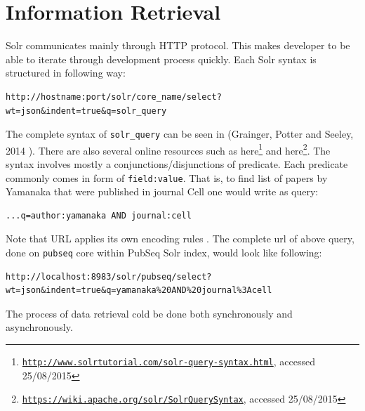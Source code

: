 \section{Information Retrieval}

Solr communicates mainly through HTTP protocol. This makes developer to be able to iterate through development process quickly. Each Solr syntax is structured in following way:

\begin{lstlisting}[breaklines]
http://hostname:port/solr/core_name/select?wt=json&indent=true&q=solr_query
\end{lstlisting}

The complete syntax of \texttt{solr\_query} can be seen in (Grainger, Potter and Seeley, 2014 \citep{grainger2014solr}). There are also several online resources such as here\footnote{\href{http://www.solrtutorial.com/solr-query-syntax.html}{\texttt{http://www.solrtutorial.com/solr-query-syntax.html}}, accessed 25/08/2015} and here\footnote{\href{https://wiki.apache.org/solr/SolrQuerySyntax}{\texttt{https://wiki.apache.org/solr/SolrQuerySyntax}}, accessed 25/08/2015}. The syntax involves mostly a conjunctions/disjunctions of predicate. Each predicate commonly comes in form of \texttt{field:value}. That is, to find list of papers by Yamanaka that were published in journal Cell one would write as query:

\begin{lstlisting}[breaklines]
...q=author:yamanaka AND journal:cell
\end{lstlisting}

Note that URL applies its own encoding rules \citep{weiler2010rsync}. The complete url of above query, done on \texttt{pubseq} core within PubSeq Solr index, would look like following:

\begin{lstlisting}[breaklines]
http://localhost:8983/solr/pubseq/select?wt=json&indent=true&q=yamanaka%20AND%20journal%3Acell
\end{lstlisting}

The process of data retrieval cold be done both synchronously and asynchronously.



